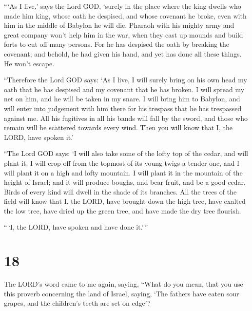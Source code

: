  ```As I live,' says the Lord GOD, `surely in the place
where the king dwells who made him king, whose oath he despised, and
whose covenant he broke, even with him in the middle of Babylon he will
die.  Pharaoh with his mighty army and great company won't
help him in the war, when they cast up mounds and build forts to cut off
many persons.  For he has despised the oath by breaking the
covenant; and behold, he had given his hand, and yet has done all these
things. He won't escape.

 ``Therefore the Lord GOD says: `As I live, I will surely
bring on his own head my oath that he has despised and my covenant that
he has broken.  I will spread my net on him, and he will be
taken in my snare. I will bring him to Babylon, and will enter into
judgement with him there for his trespass that he has trespassed against
me.  All his fugitives in all his bands will fall by the
sword, and those who remain will be scattered towards every wind. Then
you will know that I, the LORD, have spoken it.'

 ``The Lord GOD says: `I will also take some of the lofty
top of the cedar, and will plant it. I will crop off from the topmost of
its young twigs a tender one, and I will plant it on a high and lofty
mountain.  I will plant it in the mountain of the height of
Israel; and it will produce boughs, and bear fruit, and be a good cedar.
Birds of every kind will dwell in the shade of its branches.
 All the trees of the field will know that I, the LORD,
have brought down the high tree, have exalted the low tree, have dried
up the green tree, and have made the dry tree flourish.

``\,`I, the LORD, have spoken and have done it.'\,''

\hypertarget{section-16}{%
\section{18}\label{section-16}}

 The LORD's word came to me again, saying, 
``What do you mean, that you use this proverb concerning the land of
Israel, saying, `The fathers have eaten sour grapes, and the children's
teeth are set on edge'?

